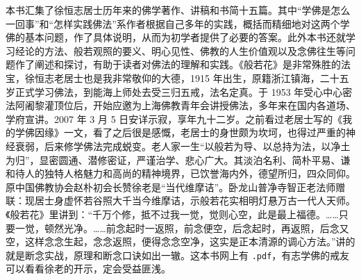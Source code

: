 \begin{book}
    本书汇集了徐恒志居士历年来的佛学著作、讲稿和书简十五篇。其中“学佛是怎么一回事”和“怎样实践佛法”系作者根据自己多年的实践，概括而精细地对这两个学佛的基本问题，作了具体说明，从而为初学者提供了必要的答案。此外本书还就学习经论的方法、般若观照的要义、明心见性、佛教的人生价值观以及念佛往生等问题作了阐述和探讨，有助于读者对佛法的理解和实践。《般若花》是非常殊胜的法宝，徐恒志老居士也是我非常敬仰的大德，1915 年出生，原籍浙江镇海，二十五岁正式学习佛法，到能海上师处去受三归五戒，法名定真。于 1953 年受心中心密法阿阇黎灌顶位后，开始应邀为上海佛教青年会讲授佛法，多年来在国内各道场、学府宣讲。2007 年 3 月 5 日安详示寂，享年九十二岁。之前看过老居士写的《我的学佛因缘》一文，看了之后很是感慨，老居士的身世颇为坎坷，也得过严重的神经衰弱，后来修学佛法完成蜕变。老人家一生“以般若为导、以总持为法，以净土为归”，显密圆通、潜修密证，严谨治学、悲心广大。其淡泊名利、简朴平易、谦和待人的独特人格魅力和高尚的精神境界，已饮誉海内外，德望所归，四众同仰。原中国佛教协会赵朴初会长赞徐老是“当代维摩诘”。卧龙山普净寺智正老法师赠联：现居士身虚怀若谷照大千当今维摩诘，示般若花实相明灯悬万古一代人天师。《般若花》里讲到：“千万个修，抵不过我一觉，觉则心空，此是最上福德。……只要一觉，顿然光净。……前念起时一返照，前念便空，后念起时，再返照，后念又空，这样念念生起，念念返照，便得念念空净，这实是正本清源的调心方法。”讲的就是断念实战，原理和断念口诀如出一辙。这本书网上有 \texttt{.pdf}，有志学佛的戒友可以看看徐老的开示，定会受益匪浅。
\end{book}
